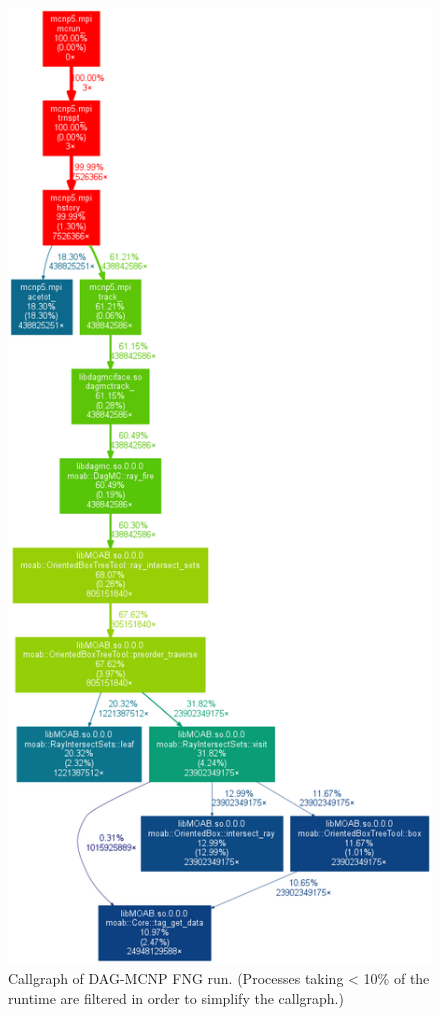 \documentclass[10pt, a4paper]{article}
\begin{document}
\begin{figure}[H]
  \centering
  \caption{Callgraph of DAG-MCNP FNG run. (Processes taking < 10\% of the runtime are filtered in order to simplify the callgraph.) }
  \label{dagmc-fng-coarse}
  \includegraphics[scale=0.35]{dagmc_fng_cg_coarse.png}
\end{figure}
\end{document}
